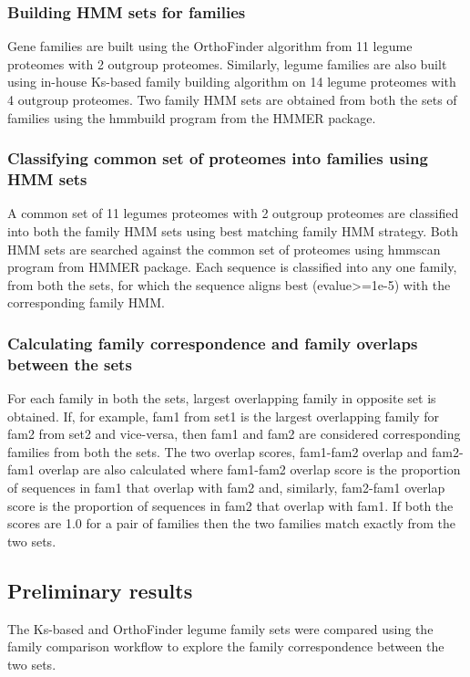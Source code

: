 \documentclass{article}
\begin{document}
			\subsubsection{Building HMM sets for families}
			Gene families are built using the OrthoFinder algorithm from 11 legume proteomes with 2 outgroup proteomes. Similarly, legume families are also built using in-house Ks-based family building algorithm on 14 legume proteomes with 4 outgroup proteomes. Two family HMM sets are obtained from both the sets of families using the hmmbuild program from the HMMER package.
			
			\subsubsection{Classifying common set of proteomes into families using HMM sets}
			A common set of 11 legumes proteomes with 2 outgroup proteomes are classified into both the family HMM sets using best matching family HMM strategy. Both HMM sets are searched against the common set of proteomes using hmmscan program from HMMER package. Each sequence is classified into any one family, from both the sets, for which the sequence aligns best (evalue>=1e-5) with the corresponding family HMM.
			
			\subsubsection{Calculating family correspondence and family overlaps between the sets}
			For each family in both the sets, largest overlapping family in opposite set  is obtained. If, for example, fam1 from set1 is the largest overlapping family for fam2 from set2 and vice-versa, then fam1 and fam2 are considered corresponding families from both the sets. The two overlap scores, fam1-fam2 overlap and fam2-fam1 overlap are also calculated where fam1-fam2 overlap score is the proportion of sequences in fam1 that overlap with fam2 and, similarly, fam2-fam1 overlap score is the proportion of sequences in fam2 that overlap with fam1. If both the scores are 1.0 for a pair of families then the two families match exactly from the two sets.
			
		\subsection{Preliminary results}
		The Ks-based and OrthoFinder legume family sets were compared using the family comparison workflow to explore the family correspondence between the two sets.
		
\end{document}
